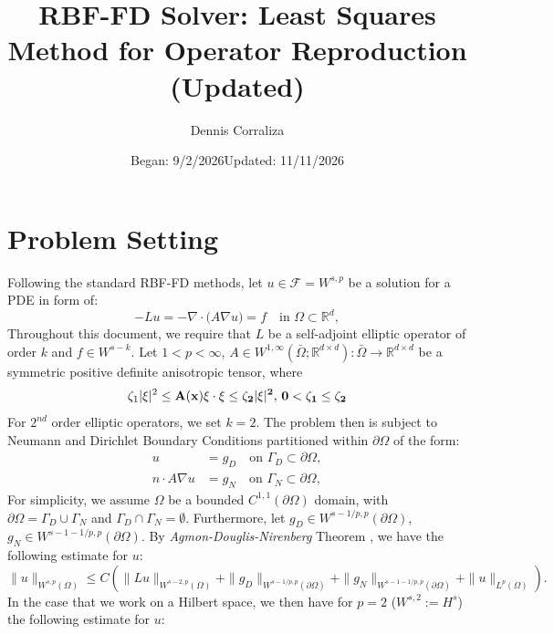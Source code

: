 \documentclass[11pt]{article}
\title{RBF-FD Solver: Least Squares Method for Operator Reproduction (Updated)}
\author{Dennis Corraliza}
\date{Began: 9/2/2026}
\date{Updated: 11/11/2026}
\newcommand{\diver}{\nabla\!\cdot}
\newcommand{\grad}{\nabla}
\begin{document}
\maketitle

\tableofcontents

\pagebreak

\section{Problem Setting}

Following the standard RBF-FD methods, let $u \in \mathcal{F} = W^{s,p}$ be a solution for a PDE in form of:
\begin{equation}
	- Lu = -\diver\!\big(A \grad u\big) = f \quad \text{in } \Omega \subset \mathbb{R}^d,
	\label{eq:PDE}
\end{equation}
Throughout this document, we require that $L$ be a self-adjoint elliptic operator of order $k$ and $f \in W^{s-k}$. Let $1<p<\infty$, $A \in W^{1,\infty} (\bar{\Omega}; \mathbb{R}^{d \times d}):\bar{\Omega} \rightarrow \mathbb{R}^{d \times d}$ be a symmetric positive definite anisotropic tensor, where
\begin{equation}
	\zeta_1 |\xi|^2 \le \bf{A}(\bf{x}) \xi \cdot \xi \le \zeta_2 |\xi|^2 \text{, } 0 < \zeta_1 \le \zeta_2
\end{equation}
For $2^{nd}$ order elliptic operators, we set $k=2$. The problem then is subject to Neumann and Dirichlet Boundary Conditions partitioned within $\partial \Omega$ of the form:
\begin{align}
  u &= g_D \quad \text{on } \Gamma_D \subset \partial\Omega, \\
  n \cdot A \grad u &= g_N \quad
  \text{on } \Gamma_N \subset \partial\Omega,
  \label{eq:neumann-bc}
\end{align}
For simplicity, we assume $\Omega$ be a bounded $C^{1,1}(\partial \Omega)$ domain, with $\partial \Omega = \Gamma_D \cup \Gamma_N$ and $\Gamma_D \cap \Gamma_N = \emptyset$. Furthermore, let $g_D \in W^{s-1/p,p}(\partial \Omega)$, $g_N \in W^{s-1-1/p,p}(\partial \Omega)$. By \textit{Agmon-Douglis-Nirenberg} Theorem \cite{Agmon}, we have the following estimate for $u$:
\begin{equation}
\|u\|_{W^{s,p}(\Omega)} \leq C\left(\|Lu\|_{W^{s-2,p}(\Omega)} + \|g_D\|_{W^{s-1/p,p}(\partial\Omega)} + \|g_N\|_{W^{s-1-1/p,p}(\partial\Omega)} + \|u\|_{L^p(\Omega)} \right).
\end{equation}
In the case that we work on a Hilbert space, we then have for $p=2$ ($W^{s,2} := H^s$) the following estimate for $u$:
\end{document}
